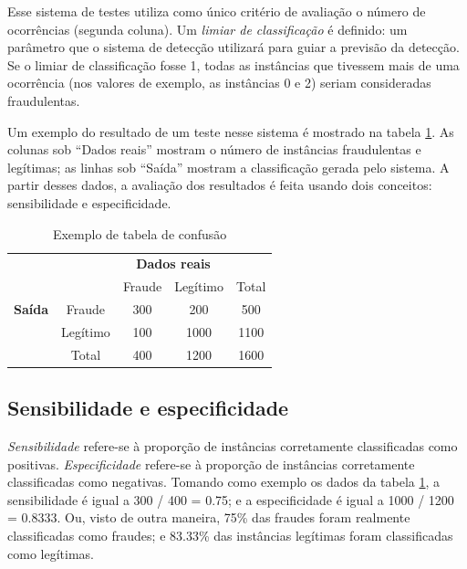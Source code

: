 Esse sistema de testes utiliza como único critério de avaliação o número de ocorrências (segunda coluna). Um \emph{limiar de classificação} é definido: um parâmetro que o sistema de detecção utilizará para guiar a previsão da detecção. Se o limiar de classificação fosse 1, todas as instâncias que tivessem mais de uma ocorrência (nos valores de exemplo, as instâncias 0 e 2) seriam consideradas fraudulentas.

Um exemplo do resultado de um teste nesse sistema é mostrado na tabela \ref{fraud:ex}. As colunas sob ``Dados reais'' mostram o número de instâncias fraudulentas e legítimas; as linhas sob ``Saída'' mostram a classificação gerada pelo sistema. A partir desses dados, a avaliação dos resultados é feita usando dois conceitos: sensibilidade e especificidade.

\renewcommand{\arraystretch}{1.5}
\vspace{2mm}
\begin{table}[h!]
    \centering
    \begin{tabular}{c l c c c}
        & & \multicolumn{2}{c}{\textbf{Dados reais}} \\
        \multirow{3}{5mm}{\begin{sideways}\parbox{20mm}{\textbf{Saída}}\end{sideways}} & \multicolumn{1}{c|}{} & Fraude & Legítimo & \multicolumn{1}{|c}{Total} \\
        \cline{2-5}
        & \multicolumn{1}{c|}{Fraude}   & 300 & 200   & \multicolumn{1}{|c}{500}  \\
        & \multicolumn{1}{c|}{Legítimo} & 100 & 1000  & \multicolumn{1}{|c}{1100} \\
        \cline{2-5}
        & \multicolumn{1}{c|}{Total}    & 400 & 1200  & \multicolumn{1}{|c}{1600} \\
    \end{tabular}
    \caption{Exemplo de tabela de confusão}
    \label{fraud:ex}
\end{table}
\vspace{2mm}

\subsection{Sensibilidade e especificidade}

\emph{Sensibilidade} refere-se à proporção de instâncias corretamente classificadas como positivas. \emph{Especificidade} refere-se à proporção de instâncias corretamente classificadas como negativas. Tomando como exemplo os dados da tabela \ref{fraud:ex}, a sensibilidade é igual a 300 / 400 = 0.75; e a especificidade é igual a 1000 / 1200 = 0.8333. Ou, visto de outra maneira, 75\% das fraudes foram realmente classificadas como fraudes; e 83.33\% das instâncias legítimas foram classificadas como legítimas.

